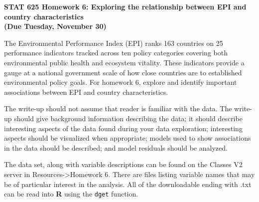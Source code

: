 \documentclass[12pt]{article}
\newcommand{\proglang}[1]{\textbf{#1}}
\newcommand{\code}[1]{\texttt{#1}}
\begin{document}
\doublespace




\begin{center}


{\Large\bf STAT 625 
Homework 6: Exploring the relationship between EPI and country 
characteristics\\
(Due Tuesday, November 30)\\


}



\end{center}

\begin{raggedright}
\parindent=0.5in



\noindent The Environmental Performance Index (EPI) ranks 163 countries on 25 
performance indicators tracked across ten policy categories covering both 
environmental public health and ecosystem vitality. These indicators provide a 
gauge at a national government scale of how close countries are to established 
environmental policy goals. For homework 6, explore and identify important 
associations between EPI and country characteristics.

The write-up should not assume that reader is 
familiar with the data.  The 
write-up should give background information describing the data; it should 
describe interesting aspects of the data found during your data exploration; 
interesting aspects should be visualized when appropriate; models used to 
show associations in the data should be described; and model residuals should 
be analyzed.

The data set, along with variable descriptions can be found on the 
Classes V2 server in Resources->Homework 6.  There are files listing variable 
names that may be of particular interest in the analysis.  All of the 
downloadable ending with .txt can be read into \proglang{R} using the
\code{dget} function.

\end{raggedright}
\end{document}
